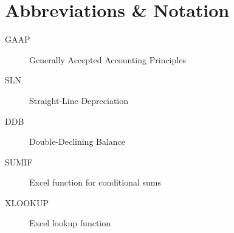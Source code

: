 \chapter*{Abbreviations \& Notation}
\begin{description}
  \item[GAAP] Generally Accepted Accounting Principles  
  \item[SLN] Straight-Line Depreciation  
  \item[DDB] Double-Declining Balance  
  \item[SUMIF] Excel function for conditional sums  
  \item[XLOOKUP] Excel lookup function  
\end{description}
